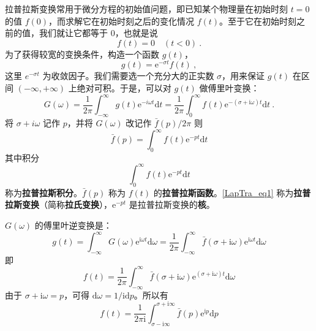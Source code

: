 
拉普拉斯变换常用于微分方程的初始值问题，即已知某个物理量在初始时刻 $t=0$ 的值 $f(0)$，而求解它在初始时刻之后的变化情况 $f(t)$。至于它在初始时刻之前的值，我们就让它都等于 $0$，也就是说
\begin{equation}
f(t)=0 \quad(t<0)~.
\end{equation}
为了获得较宽的变换条件，构造一个函数 $g(t)$，
\begin{equation}
g(t)=\mathrm{e}^{-\sigma t} f(t)~,
\end{equation}
这里 $e^{-\sigma t}$ 为收敛因子。我们需要选一个充分大的正实数 $\sigma$，用来保证 $g(t) $ 在区间 $(-\infty,+\infty)$ 上绝对可积。于是，可以对 $g(t) $ 做傅里叶变换：
\begin{equation}
G(\omega)=\frac{1}{2 \pi} \int_{-\infty}^{\infty} g(t) \mathrm{e}^{-i\omega t} \mathrm{d} t=\frac{1}{2 \pi} \int_{0}^{\infty} f(t) \mathrm{e}^{-(\sigma+\mathrm{i} \omega) t} \mathrm{d} t~.
\end{equation}
将 $\sigma+i \omega$ 记作 $p$，并将 $G(\omega)$ 改记作 $\bar f(p) / 2 \pi$ 则
\begin{equation} \label{LapTra_eq1}
\bar{f}(p)=\int_{0}^{\infty} f(t) \mathrm{e}^{-p t} \mathrm{d} t
\end{equation}
其中积分
\begin{equation}
\int_{0}^{\infty} f(t) \mathrm{e}^{-p t} \mathrm{d} t
\end{equation}
称为\textbf{拉普拉斯积分}。$\bar f(p)$ 称为 $f(t)$ 的\textbf{拉普拉斯函数}。\autoref{LapTra_eq1} 称为\textbf{拉普拉斯变换}（简称\textbf{拉氏变换}），$\mathrm e^{-pt}$ 是拉普拉斯变换的\textbf{核}。

$G(\omega)$ 的傅里叶逆变换是：
\begin{equation}
g(t)=\int_{-\infty}^{\infty} G(\omega) \mathrm{e}^{\mathrm{i} \omega t} \mathrm{d} \omega=\frac{1}{2 \pi} \int_{-\infty}^{\infty} \bar{f}(\sigma+\mathrm{i} \omega) \mathrm{e}^{\mathrm{i} \omega t} \mathrm{d} \omega
\end{equation}
即
\begin{equation}
f(t)=\frac{1}{2 \pi} \int_{-\infty}^{\infty} \bar{f}(\sigma+\mathrm{i} \omega) \mathrm{e}^{(\sigma+\mathrm{i} \omega)t} \mathrm{d} \omega
\end{equation}
由于 $\sigma+\mathrm i\omega=p$，可得 $\mathrm d\omega = 1/\mathrm i\mathrm dp$。所以有
\begin{equation}
f(t)=\frac{1}{2 \pi \mathrm{i}} \int_{\sigma-\mathrm{i} \infty}^{\sigma+\mathrm{i} \infty} \bar{f}(p) \mathrm{e}^{\mathrm{i} p} \mathrm{d} p
\end{equation}

